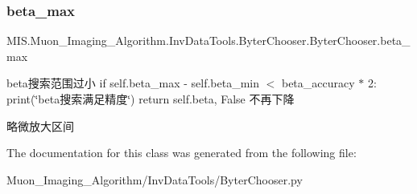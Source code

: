\subsubsection{\texorpdfstring{beta\+\_\+max}{beta\_max}}
{\footnotesize\ttfamily M\+I\+S.\+Muon\+\_\+\+Imaging\+\_\+\+Algorithm.\+Inv\+Data\+Tools.\+Byter\+Chooser.\+Byter\+Chooser.\+beta\+\_\+max}



beta搜索范围过小 if self.\+beta\+\_\+max -\/ self.\+beta\+\_\+min $<$ beta\+\_\+accuracy $\ast$ 2\+: print(\char`\"{}beta搜索满足精度\char`\"{}) return self.\+beta, False 不再下降 

略微放大区间 

The documentation for this class was generated from the following file\+:\begin{DoxyCompactItemize}
\item 
Muon\+\_\+\+Imaging\+\_\+\+Algorithm/\+Inv\+Data\+Tools/Byter\+Chooser.\+py\end{DoxyCompactItemize}
